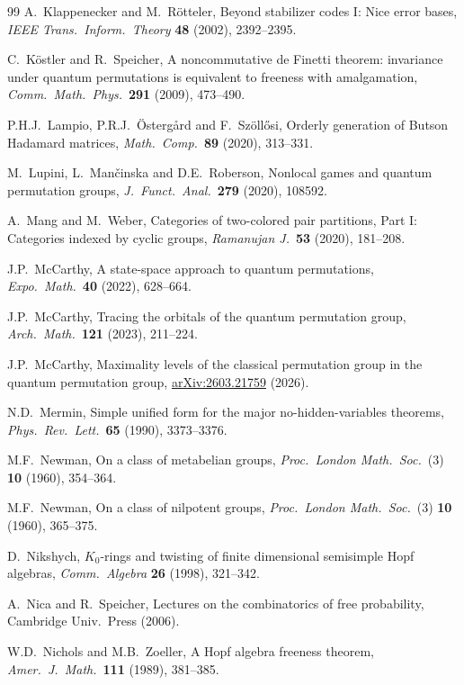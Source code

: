 \documentclass[11pt]{amsart}
\theoremstyle{definition}
\theoremstyle{remark}
\theoremstyle{plain}
\numberwithin{equation}{section}
\numberwithin{table}{section}
\begin{document}
\begin{thebibliography}{99}
 A.~Klappenecker and M.~R\"otteler, Beyond stabilizer codes I: Nice error bases, \emph{IEEE Trans.\ Inform.\ Theory} \textbf{48} (2002), 2392--2395.

 C.~K\"ostler and R.~Speicher, A noncommutative de Finetti theorem: invariance under quantum permutations is equivalent to freeness with amalgamation, \emph{Comm.\ Math.\ Phys.}\ \textbf{291} (2009), 473--490.

 P.H.J.~Lampio, P.R.J.~\"Osterg\aa rd and F.~Sz\"oll\H{o}si, Orderly generation of Butson Hadamard matrices, \emph{Math.\ Comp.}\ \textbf{89} (2020), 313--331.

 M.~Lupini, L.~Man\v{c}inska and D.E.~Roberson, Nonlocal games and quantum permutation groups, \emph{J.\ Funct.\ Anal.}\ \textbf{279} (2020), 108592.

 A.~Mang and M.~Weber, Categories of two-colored pair partitions, Part I: Categories indexed by cyclic groups, \emph{Ramanujan J.}\ \textbf{53} (2020), 181--208.

 J.P.~McCarthy, A state-space approach to quantum permutations, \emph{Expo.\ Math.}\ \textbf{40} (2022), 628--664.

 J.P.~McCarthy, Tracing the orbitals of the quantum permutation group, \emph{Arch.\ Math.}\ \textbf{121} (2023), 211--224.

 J.P.~McCarthy, Maximality levels of the classical permutation group in the quantum permutation group, \href{https://arxiv.org/pdf/2603.21759}{arXiv:2603.21759} (2026).

 N.D.~Mermin, Simple unified form for the major no-hidden-variables theorems, \emph{Phys.\ Rev.\ Lett.}\ \textbf{65} (1990), 3373--3376.

 M.F.~Newman, On a class of metabelian groups, \emph{Proc.\ London Math.\ Soc.}\ (3) \textbf{10} (1960), 354--364.

 M.F.~Newman, On a class of nilpotent groups, \emph{Proc.\ London Math.\ Soc.}\ (3) \textbf{10} (1960), 365--375.

 D.~Nikshych, $K_0$-rings and twisting of finite dimensional semisimple Hopf algebras, \emph{Comm.\ Algebra} \textbf{26} (1998), 321--342.

 A.~Nica and R.~Speicher, Lectures on the combinatorics of free probability, Cambridge Univ.\ Press (2006).

 W.D.~Nichols and M.B.~Zoeller, A Hopf algebra freeness theorem, \emph{Amer.\ J.\ Math.}\ \textbf{111} (1989), 381--385.


\end{thebibliography}
\end{document}
